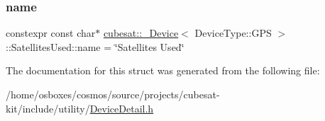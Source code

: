 \subsubsection{\texorpdfstring{name}{name}}
{\footnotesize\ttfamily constexpr const char$\ast$ \hyperlink{structcubesat_1_1__Device}{cubesat\+::\+\_\+\+Device}$<$ Device\+Type\+::\+G\+PS $>$\+::Satellites\+Used\+::name = \char`\"{}Satellites Used\char`\"{}\hspace{0.3cm}{\ttfamily [static]}}



The documentation for this struct was generated from the following file\+:\begin{DoxyCompactItemize}
\item 
/home/osboxes/cosmos/source/projects/cubesat-\/kit/include/utility/\hyperlink{DeviceDetail_8h}{Device\+Detail.\+h}\end{DoxyCompactItemize}
